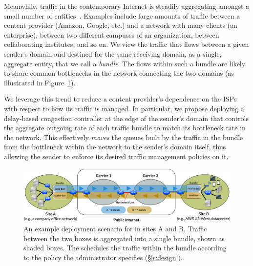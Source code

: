 Meanwhile, traffic in the contemporary Internet is steadily aggregating amongst a small number of entities~\cite{fivecomps}. 
Examples include large amounts of traffic between a content provider (\eg Amazon, Google, etc.) and a network with many clients (\eg an enterprise), between two different campuses of an organization, between collaborating institutes, and so on.
We view the traffic that flows between a given sender's domain and destined for the same receiving domain, as a single, aggregate entity, that we call a \emph{bundle}.
The flows within such a bundle are likely to share common bottlenecks in the network connecting the two domains (as illustrated in Figure~\ref{fig:deploy:arch}). %

We leverage this trend to reduce a content provider's dependence on the ISPs with respect to how its traffic is managed. In particular, we propose deploying a delay-based congestion controller at the edge of the sender's domain that controls the aggregate outgoing rate of each traffic bundle to match its bottleneck rate in the network. This effectively \emph{moves} the queues built by the traffic in the bundle from the bottleneck within the network to the sender’s domain itself, thus allowing the sender to enforce its desired traffic management policies on it. 

\fi




\begin{figure}[t]
    \centering
    \includegraphics[width=\textwidth]{img/deployment-arch.pdf}
    \caption{An example deployment scenario for \name in sites A and B.
    Traffic between the two boxes is aggregated into a single bundle, shown as shaded boxes. The \inbox schedules the traffic within the bundle according to the policy the administrator specifies (\S\ref{s:design}).
    }
    \label{fig:deploy:arch}
\end{figure}

